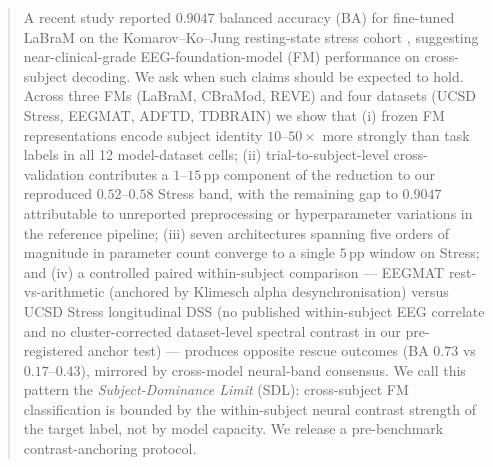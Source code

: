 \begin{abstract}
A recent study reported $0.9047$ balanced accuracy (BA) for
fine-tuned LaBraM on the Komarov--Ko--Jung resting-state stress
cohort \citep{wang2025stress,komarov2020stress}, suggesting
near-clinical-grade EEG-foundation-model (FM) performance on
cross-subject decoding. We ask when such claims should be expected
to hold. Across three FMs (LaBraM, CBraMod, REVE) and four datasets
(UCSD Stress, EEGMAT, ADFTD, TDBRAIN) we show that (i) frozen FM
representations encode subject identity $10$--$50\times$ more
strongly than task labels in all 12 model-dataset cells; (ii)
trial-to-subject-level cross-validation contributes a $1$--$15$\,pp
component of the reduction to our reproduced $0.52$--$0.58$ Stress
band, with the remaining gap to $0.9047$ attributable to unreported
preprocessing or hyperparameter variations in the reference pipeline; (iii) seven
architectures spanning five orders of magnitude in parameter count
converge to a single $5$\,pp window on Stress; and (iv) a controlled
paired within-subject comparison --- EEGMAT rest-vs-arithmetic
(anchored by Klimesch alpha desynchronisation) versus UCSD Stress
longitudinal DSS (no published within-subject EEG correlate and no
cluster-corrected dataset-level spectral contrast in our
pre-registered anchor test) --- produces opposite rescue outcomes
(BA $0.73$ vs $0.17$--$0.43$), mirrored by cross-model neural-band
consensus. We call this pattern the \emph{Subject-Dominance Limit}
(SDL): cross-subject FM classification is bounded by the
within-subject neural contrast strength of the target label, not by
model capacity. We release a pre-benchmark contrast-anchoring
protocol.
\end{abstract}
